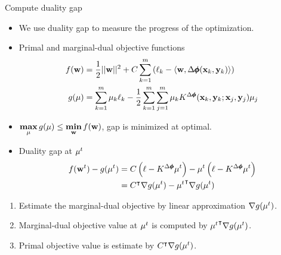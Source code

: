 \documentclass[first=dgreen,second=purple,logo=yellowexc]{aaltoslides}
\begin{document}
%
\begin{frame}{Compute duality gap}
	\begin{itemize}\footnotesize
		\item We use duality gap to measure the progress of the optimization.
		\item Primal and marginal-dual objective functions
		\begin{align*}\footnotesize
			f(\mathbf {w}) &= \frac{1}{2}||\mathbf {w}||^2 + C\sum_{k=1}^m\left(\ell_k-\langle \mathbf {w}, \Delta\pmb \phi(\mathbf {x}_k,\mathbf {y}_k) \rangle\right)\\
			g(\mathbf {\mu}) &= \sum_{k=1}^m\mu_k\ell_k - \frac{1}{2}\sum_{k=1}^m\sum_{j=1}^m\mu_kK^{\Delta\pmb \phi}(\mathbf {x}_k,\mathbf {y}_k;\mathbf {x}_j,\mathbf {y}_j)\mu_j
		\end{align*}
		\item $\underset{\mathbf {\mu}}{\textbf{max}}\,g(\mathbf {\mu})\le \underset{\mathbf {w}}{\textbf{min}}\,f(\mathbf {w})$, gap is minimized at optimal.
		\item Duality gap at $\mathbf {\mu}^t$
		\begin{align*}\footnotesize
			f(\mathbf {w}^t) - g(\mathbf {\mu}^t) &= C\left(\mathbf {\ell}-K^{\Delta\pmb \phi}\mathbf {\mu}^t\right) - \mathbf {\mu}^t\left(\mathbf {\ell}-K^{\Delta\pmb \phi}\mathbf {\mu}^t\right)\\
			&= C^{\intercal} \nabla g(\mathbf {\mu}^t) -{\mathbf {\mu}^t} ^{\intercal} \nabla g(\mathbf {\mu}^t)
		\end{align*}
	\end{itemize}
		\begin{enumerate}\footnotesize
			\item Estimate the marginal-dual objective by linear approximation $\nabla g(\mathbf {\mu}^t)$.
			\item Marginal-dual objective value at $\mathbf {\mu}^t$ is computed by ${\mathbf {\mu}^t} ^{\intercal} \nabla g(\mathbf {\mu}^t)$.
			\item Primal objective value is estimate by $C^{\intercal} \nabla g(\mathbf {\mu}^t)$.
		\end{enumerate}
\end{frame}
\end{document}
